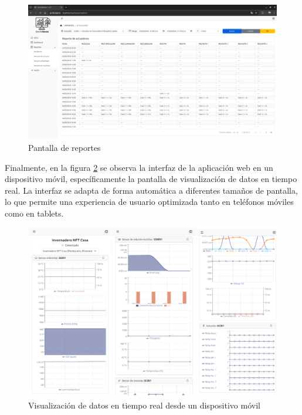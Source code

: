 \begin{figure}[H]
    \centering
    \includegraphics[width=\textwidth]{./Images/28_reportes_3.png}
    \caption{Pantalla de reportes}
    \label{fig:reportes_tabla_actuadores}
\end{figure}

Finalmente, en la figura \ref{fig:dashboard_celular} se observa la interfaz de
la aplicación web en un dispositivo móvil, específicamente la pantalla de
visualización de datos en tiempo real. La interfaz se adapta de forma
automática a diferentes tamaños de pantalla, lo que permite una experiencia de
usuario optimizada tanto en teléfonos móviles como en tablets.

\begin{figure}[H]
    \centering
    \includegraphics[width=\textwidth]{./Images/29_dashboard_celular.png}
    \caption{Visualización de datos en tiempo real desde un dispositivo móvil}
    \label{fig:dashboard_celular}
\end{figure}


